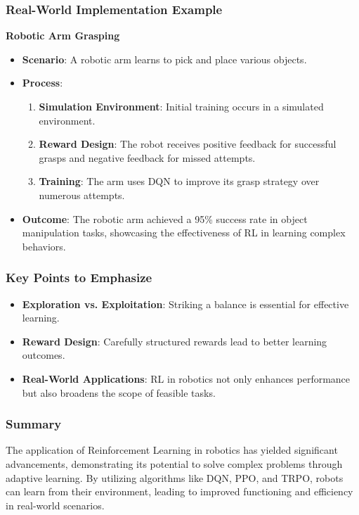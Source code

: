 \documentclass[aspectratio=169]{beamer}
\begin{document}
\begin{frame}[fragile]
    \frametitle{Real-World Implementation Example}
    \textbf{Robotic Arm Grasping}
    \begin{itemize}
        \item \textbf{Scenario}: A robotic arm learns to pick and place various objects.
        \item \textbf{Process}:
        \begin{enumerate}
            \item \textbf{Simulation Environment}: Initial training occurs in a simulated environment.
            \item \textbf{Reward Design}: The robot receives positive feedback for successful grasps and negative feedback for missed attempts.
            \item \textbf{Training}: The arm uses DQN to improve its grasp strategy over numerous attempts.
        \end{enumerate}
        \item \textbf{Outcome}:
        The robotic arm achieved a 95\% success rate in object manipulation tasks, showcasing the effectiveness of RL in learning complex behaviors.
    \end{itemize}
\end{frame}

\begin{frame}[fragile]
    \frametitle{Key Points to Emphasize}
    \begin{itemize}
        \item \textbf{Exploration vs. Exploitation}: Striking a balance is essential for effective learning.
        \item \textbf{Reward Design}: Carefully structured rewards lead to better learning outcomes.
        \item \textbf{Real-World Applications}: RL in robotics not only enhances performance but also broadens the scope of feasible tasks.
    \end{itemize}
\end{frame}

\begin{frame}[fragile]
    \frametitle{Summary}
    The application of Reinforcement Learning in robotics has yielded significant advancements, demonstrating its potential to solve complex problems through adaptive learning. 
    By utilizing algorithms like DQN, PPO, and TRPO, robots can learn from their environment, leading to improved functioning and efficiency in real-world scenarios.
\end{frame}
\end{document}
